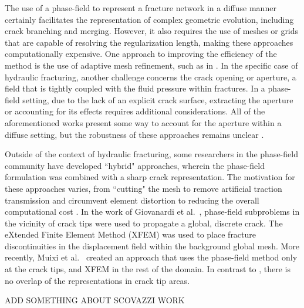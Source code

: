     The use of a phase-field to represent a fracture network in a diffuse manner certainly facilitates the representation of complex geometric evolution, including crack branching and merging. However, it also requires the use of meshes or grids that are capable of resolving the regularization length, making these approaches computationally expensive. One approach to improving the efficiency of the method is the use of adaptive mesh refinement, such as in \cite{heister2015primal, lee2017iterative, Wick-adaptive-2020,Gupta-adaptive-2022}. In the specific case of hydraulic fracturing, another challenge concerns the crack opening or aperture, a field that is tightly coupled with the fluid pressure within fractures. In a phase-field setting, due to the lack of an explicit crack surface, extracting the aperture or accounting for its effects requires additional considerations.  All of the aforementioned  works present some way to account for the aperture within a diffuse setting, but the robustness of these approaches remains unclear \cite{lecampion2018numerical}. 

    Outside of the context of hydraulic fracturing, some researchers in the phase-field community have developed ``hybrid" approaches, wherein the phase-field formulation was combined with a sharp crack representation. The motivation for these approaches varies, from ``cutting" the mesh to remove artificial traction transmission and circumvent element distortion \cite{geelen2018optimization} to reducing the overall computational cost \cite{giovanardi2017hybrid, muixi2021combined}. In the work of Giovanardi et al.\ \cite{giovanardi2017hybrid}, phase-field subproblems in the vicinity of  crack tips were used to propagate a global, discrete crack. The eXtended Finite Element Method (XFEM)\cite{moes1999finite} was used to place fracture discontinuities in the displacement field within the background global mesh. More recently, Muixi et al.\ \cite{muixi2021combined} created an approach that uses the phase-field method only at the crack tips, and XFEM in the rest of the domain. In contrast to \cite{giovanardi2017hybrid}, there is no overlap of the representations in crack tip areas.

    ADD SOMETHING ABOUT SCOVAZZI WORK

